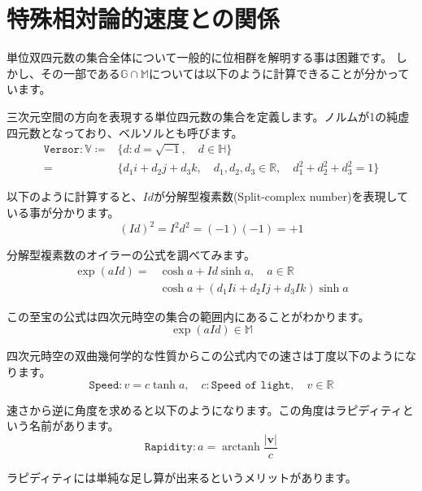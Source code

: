 \documentclass[a4paper,12pt,notitlepage]{jsreport}
\DeclareMathOperator\arctanh{arctanh}
\begin{document}
\section{特殊相対論的速度との関係}

単位双四元数の集合全体について一般的に位相群を解明する事は困難です。
しかし、その一部である$\mathbb{G}\cap\mathbb{M}$については以下のように計算できることが分かっています。

三次元空間の方向を表現する単位四元数の集合を定義します。ノルムが1の純虚四元数となっており、ベルソルとも呼びます。
\begin{equation}
\begin{split}
\texttt{Versor}:\mathbb{V}\coloneq&\{d:d=\sqrt{-1},\quad d\in\mathbb{H}\}\\
=&\{d_1i+d_2j+d_3k,\quad d_1,d_2,d_3\in\mathbb{R},\quad d_1^2+d_2^2+d_3^2=1\}
\end{split}
\end{equation}

以下のように計算すると、$Id$が分解型複素数(Split-complex number)を表現している事が分かります。
\begin{equation}
(Id)^2=I^2d^2=(-1)(-1)=+1
\end{equation}

分解型複素数のオイラーの公式を調べてみます。
\begin{equation}
\begin{split}
\exp(aId)=&\cosh a+Id\sinh a,\quad a\in\mathbb{R}\\
&\cosh a+(d_1Ii+d_2Ij+d_3Ik)\sinh a
\end{split}
\end{equation}

この至宝の公式は四次元時空の集合の範囲内にあることがわかります。
\begin{equation}
\exp(aId)\in\mathbb{M}
\end{equation}

四次元時空の双曲幾何学的な性質からこの公式内での速さは丁度以下のようになります。
\begin{equation}
\texttt{Speed}:v=c\tanh a,\quad c:\texttt{Speed of light},\quad v\in\mathbb{R}
\end{equation}

速さから逆に角度を求めると以下のようになります。この角度はラピディティという名前があります。
\begin{equation}
\texttt{Rapidity}:a=\arctanh\frac{|\bm{v}|}{c}
\end{equation}

ラピディティには単純な足し算が出来るというメリットがあります。
\end{document}
